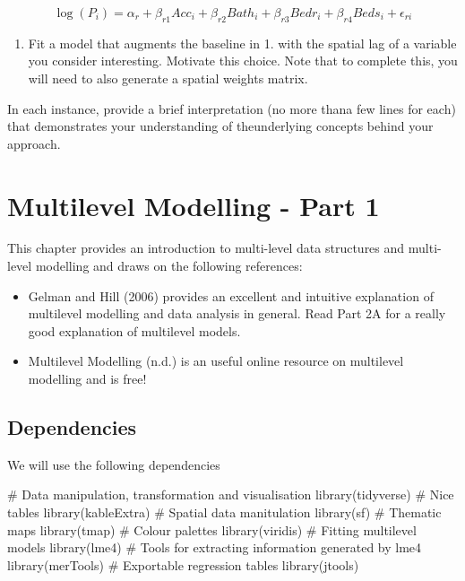 \documentclass[
  letterpaper,
  DIV=11,
  numbers=noendperiod,
  oneside]{scrreprt}
\newenvironment{Shaded}{\begin{snugshade}}{\end{snugshade}}
\newcommand{\CommentTok}[1]{\textcolor[rgb]{0.37,0.37,0.37}{#1}}
\newcommand{\FunctionTok}[1]{\textcolor[rgb]{0.28,0.35,0.67}{#1}}
\newcommand{\NormalTok}[1]{\textcolor[rgb]{0.00,0.23,0.31}{#1}}
\providecommand{\tightlist}{%
  \setlength{\itemsep}{0pt}\setlength{\parskip}{0pt}}\usepackage{longtable,booktabs,array}
\begin{document}
\[
\log(P_i) = \alpha_r + \beta_{r1} Acc_i + \beta_{r2} Bath_i + \beta_{r3} Bedr_i + \beta_{r4} Beds_i + \epsilon_{ri}
\]

\begin{enumerate}
\def\labelenumi{\arabic{enumi}.}
\setcounter{enumi}{3}
\tightlist
\item
  Fit a model that augments the baseline in 1. with the spatial lag of a
  variable you consider interesting. Motivate this choice. Note that to
  complete this, you will need to also generate a spatial weights
  matrix.
\end{enumerate}

In each instance, provide a brief interpretation (no more thana few
lines for each) that demonstrates your understanding of theunderlying
concepts behind your approach.


\chapter{Multilevel Modelling - Part 1}\label{sec-chp7}

This chapter provides an introduction to multi-level data structures and
multi-level modelling and draws on the following references:

\begin{itemize}
\tightlist
\item
  Gelman and Hill (2006) provides an excellent and intuitive explanation
  of multilevel modelling and data analysis in general. Read Part 2A for
  a really good explanation of multilevel models.
\item
  Multilevel Modelling (n.d.) is an useful online resource on multilevel
  modelling and is free!
\end{itemize}

\section{Dependencies}\label{dependencies-4}

We will use the following dependencies

\begin{Shaded}
\begin{Highlighting}[]
\CommentTok{\# Data manipulation, transformation and visualisation}
\FunctionTok{library}\NormalTok{(tidyverse)}
\CommentTok{\# Nice tables}
\FunctionTok{library}\NormalTok{(kableExtra)}
\CommentTok{\# Spatial data manitulation}
\FunctionTok{library}\NormalTok{(sf) }
\CommentTok{\# Thematic maps}
\FunctionTok{library}\NormalTok{(tmap) }
\CommentTok{\# Colour palettes}
\FunctionTok{library}\NormalTok{(viridis) }
\CommentTok{\# Fitting multilevel models}
\FunctionTok{library}\NormalTok{(lme4)}
\CommentTok{\# Tools for extracting information generated by lme4}
\FunctionTok{library}\NormalTok{(merTools)}
\CommentTok{\# Exportable regression tables}
\FunctionTok{library}\NormalTok{(jtools)}
\end{Highlighting}
\end{Shaded}
\end{document}

